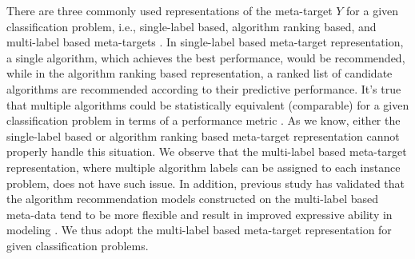\documentclass[prodmode,acmtkdd]{acmsmall}
\begin{document}
There are three commonly used representations of the meta-target $Y$ for a given classification problem,
i.e., single-label based\cite{Pise2016Algorithm}, algorithm ranking based\cite{Brazdil2003Rank}, and multi-label based meta-targets \cite{wang2014generic,zhu2018new}.
In single-label based meta-target representation,
a single algorithm, which achieves the best performance, would be recommended,
while in the algorithm ranking based representation,
a ranked list of candidate algorithms are recommended according to their predictive performance.
It's true that multiple algorithms could be statistically equivalent (comparable) for a given classification problem in terms of a performance metric \cite{wang2014generic}.
As we know, either the single-label based or algorithm ranking based meta-target representation cannot properly handle this situation.
We observe that the multi-label based meta-target representation, where multiple algorithm labels can be assigned to each instance problem,
does not have such issue.
In addition,
previous study has validated that the algorithm recommendation models constructed on the multi-label based meta-data
tend to be more flexible and result in improved expressive ability in modeling \cite{wang2014generic}.
We thus adopt the multi-label based meta-target representation for given classification problems.

\end{document}
